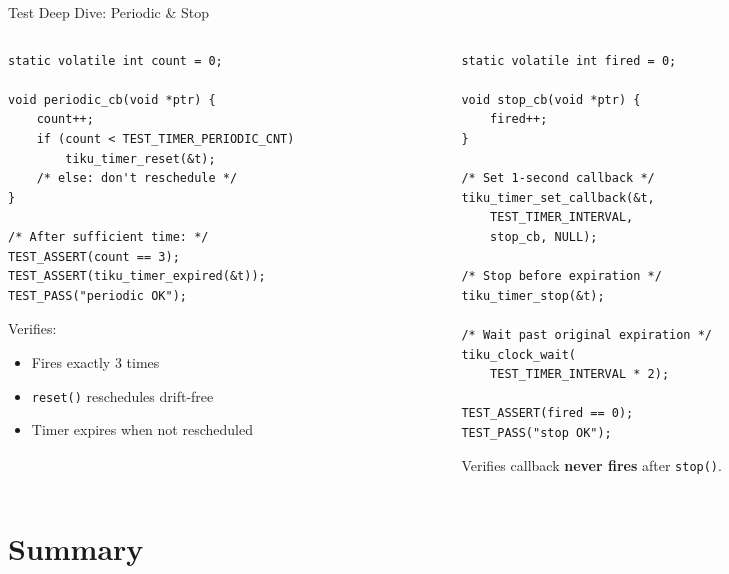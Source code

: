 \documentclass[aspectratio=169, 10pt]{beamer}
\begin{document}
\begin{frame}[fragile]{Test Deep Dive: Periodic \& Stop}
\begin{columns}[T]
\begin{column}{0.48\textwidth}
\begin{lstlisting}[style=cstyle, title={Periodic callback test}]
static volatile int count = 0;

void periodic_cb(void *ptr) {
    count++;
    if (count < TEST_TIMER_PERIODIC_CNT)
        tiku_timer_reset(&t);
    /* else: don't reschedule */
}

/* After sufficient time: */
TEST_ASSERT(count == 3);
TEST_ASSERT(tiku_timer_expired(&t));
TEST_PASS("periodic OK");
\end{lstlisting}

Verifies:
\begin{itemize}
  \item Fires exactly 3 times
  \item \texttt{reset()} reschedules drift-free
  \item Timer expires when not rescheduled
\end{itemize}
\end{column}

\begin{column}{0.48\textwidth}
\begin{lstlisting}[style=cstyle, title={Timer stop test}]
static volatile int fired = 0;

void stop_cb(void *ptr) {
    fired++;
}

/* Set 1-second callback */
tiku_timer_set_callback(&t,
    TEST_TIMER_INTERVAL,
    stop_cb, NULL);

/* Stop before expiration */
tiku_timer_stop(&t);

/* Wait past original expiration */
tiku_clock_wait(
    TEST_TIMER_INTERVAL * 2);

TEST_ASSERT(fired == 0);
TEST_PASS("stop OK");
\end{lstlisting}

Verifies callback \textbf{never fires}
after \texttt{stop()}.
\end{column}
\end{columns}
\end{frame}

\section{Summary}
\end{document}
